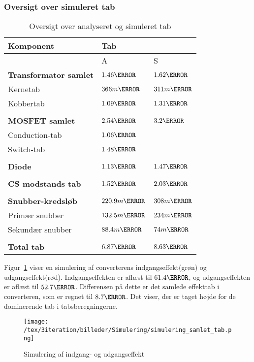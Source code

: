 \subsubsection{Oversigt over simuleret tab}
\begin{table}[H] 			
	\centering
	\begin{tabularx}{\textwidth}{|X|l|l|}
		\hline
		\textbf{\large Komponent} & \multicolumn{2}{|l|}{\textbf{\large Tab}} \\ \hline
		& A & S	\\ \hline
		\textbf{Transformator samlet} & $1.46\watt$ & $1.62\watt$ \\ \hline 
		Kernetab & $366m\watt$ & $311m\watt$ \\ \hline
		Kobbertab & $1.09\watt$ & $1.31\watt$ \\ \hline
		& &	\\ \hline
		\textbf{MOSFET samlet} & $2.54\watt$ & $3.2\watt$ \\ \hline
		Conduction-tab & $1.06\watt$ & 	\\ \hline
		Switch-tab & $1.48\watt$ & 		\\ \hline
		& &	\\ \hline
		\textbf{Diode} & $1.13\watt$ & $1.47\watt$ \\ \hline
		& &	\\ \hline
		\textbf{CS modstands tab} & $1.52\watt$ & $2.03\watt$ \\ \hline
		& &	\\ \hline
		\textbf{Snubber-kredsløb} & $220.9m\watt$ & $308m\watt$ \\ \hline
		Primær snubber	& $132.5m\watt$	& $234m\watt$		\\ \hline
		Sekundær snubber &	$88.4m\watt$ &	$74m\watt$		\\ \hline
		& &	\\ \hline
		\textbf{Total tab} & $6.87\watt$ & $8.63\watt$ \\ \hline
	\end{tabularx}
	\caption{Oversigt over analyseret og simuleret tab}
	\label{tab:simulering_tab_3}
\end{table}

Figur~\ref{fig:simulering_power_samlet} viser en simulering af converterens indgangseffekt(grøn) og udgangseffekt(rød). Indgangseffekten er aflæst til $61.4\watt$, og udgangseffekten er aflæst til $52.7\watt$. Differensen på dette er det samlede effekttab i converteren, som er regnet til $8.7\watt$. Det viser, der er taget højde for de dominerende tab i tabsberegningerne. 

\begin{figure}[H]
	\center
	\texttt{[image: /tex/3iteration/billeder/Simulering/simulering\_samlet\_tab.png]}
	\caption{Simulering af indgang- og udgangseffekt}
	\label{fig:simulering_power_samlet}
\end{figure}